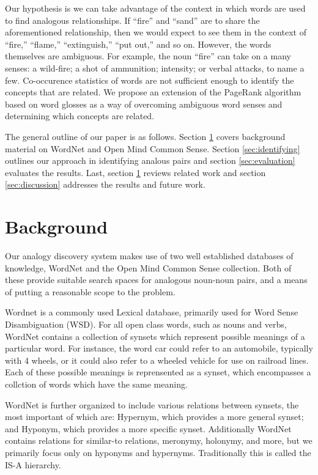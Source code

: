 \documentclass[11pt]{article}
\begin{document}
Our hypothesis is we can take advantage of the context in which words are used
to find analogous relationships.  If ``fire'' and ``sand'' are to share the
aforementioned relationship, then we would expect to see them in the context of
``fire,'' ``flame,'' ``extinguish,'' ``put out,'' and so on.  However, the words
themselves are ambiguous.  For example, the noun ``fire'' can take on a many
senses: a wild-fire; a shot of ammunition; intensity; or verbal attacks, to name
a few.  Co-occurence statistics of words are not sufficient enough to identify
the concepts that are related.  We propose an extension of the PageRank
algorithm based on word glosses as a way of overcoming ambiguous word senses and
determining which concepts are related.

The general outline of our paper is as follows.  Section \ref{sec:background}
covers background material on WordNet and Open Mind Common Sense.  Section
\ref{sec:identifying} outlines our approach in identifying analous pairs and
section \ref{sec:evaluation} evaluates the results.  Last, section
\ref{sec:background} reviews related work and section \ref{sec:discussion}
addresses the results and future work.

\section{Background}
\label{sec:background}

Our analogy discovery system makes use of two well established databases of
knowledge, WordNet \cite{fellbaum98wordnet} and the Open Mind Common Sense
\cite{havasi07conceptnet} collection.  Both of these provide suitable search
spaces for analogous noun-noun pairs, and a means of putting a reasonable scope
to the problem.

Wordnet \cite{fellbaum98wordnet} is a commonly used Lexical database, primarily used for Word Sense
Disambiguation (WSD).  For all open class words, such as nouns and verbs, WordNet
contains a collection of synsets which represent possible meanings of a
particular word.  For instance, the word car could refer to an automobile,
typically with 4 wheels, or it could also refer to a wheeled vehicle for use on
railroad lines.  Each of these possible meanings is reprensented as a synset,
which encompasses a collction of words which have the same meaning.

WordNet is further organized to include various relations between synsets, the
most important of which are: Hypernym, which provides a more general synset;
and Hyponym, which provides a more specific synset.  Additionally WordNet
contains relations for similar-to relations, meronymy, holonymy, and more, but
we primarily focus only on hyponyms and hypernyms.  Traditionally this is called
the IS-A hierarchy.
\end{document}
